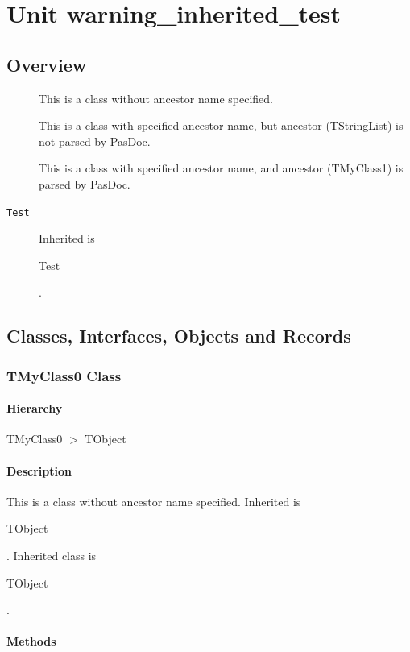\documentclass{report}
\begin{document}
\newlength{\tmplength}
\chapter{Unit warning{\_}inherited{\_}test}
\section{Overview}
\begin{description}
\item[\texttt{\begin{ttfamily}TMyClass0\end{ttfamily} Class}]This is a class without ancestor name specified.
\item[\texttt{\begin{ttfamily}TMyClass1\end{ttfamily} Class}]This is a class with specified ancestor name, but ancestor (TStringList) is not parsed by PasDoc.
\item[\texttt{\begin{ttfamily}TMyClass2\end{ttfamily} Class}]This is a class with specified ancestor name, and ancestor (TMyClass1) is parsed by PasDoc.
\end{description}
\begin{description}
\item[\texttt{Test}]Inherited is \begin{ttfamily}Test\end{ttfamily}.
\end{description}
\section{Classes, Interfaces, Objects and Records}
\subsection*{TMyClass0 Class}
\subsubsection*{\large{\textbf{Hierarchy}}\normalsize\hspace{1ex}\hfill}
TMyClass0 {$>$} TObject
\subsubsection*{\large{\textbf{Description}}\normalsize\hspace{1ex}\hfill}
This is a class without ancestor name specified. Inherited is \begin{ttfamily}TObject\end{ttfamily}. Inherited class is \begin{ttfamily}TObject\end{ttfamily}.\subsubsection*{\large{\textbf{Methods}}\normalsize\hspace{1ex}\hfill}
\end{document}
